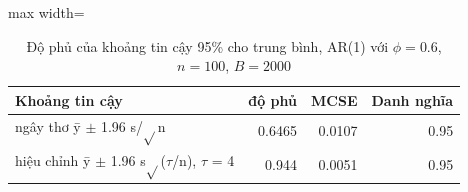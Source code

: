 \begin{table}[H]
\centering\small
\caption{Độ phủ của khoảng tin cậy 95\% cho trung bình, AR(1) với $\phi=0.6$, $n=100$, $B=2000$}\label{tab:tab_b11_03_coverage}
\begin{adjustbox}{max width=\linewidth}
\begin{tabular}{>{\raggedright\arraybackslash}p{}rrr}
\toprule
Khoảng tin cậy & độ phủ & MCSE & Danh nghĩa \\
\midrule
ngây thơ  ȳ $\pm$ 1.96 s/$\sqrt{}$n & 0.6465 & 0.0107 & 0.95 \\
hiệu chỉnh  ȳ $\pm$ 1.96 s$\sqrt{}$($\tau$/n), $\tau$ = 4 & 0.944 & 0.0051 & 0.95 \\
\bottomrule
\end{tabular}
\end{adjustbox}\par{}
\end{table}
